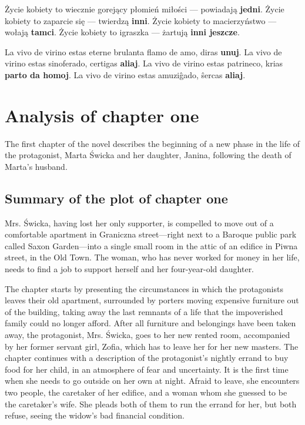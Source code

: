 \begin{displayquote}
  Życie kobiety to wiecznie gorejący płomień miłości --- powiadają \textbf{jedni}.
  Życie kobiety to zaparcie się --- twierdzą \textbf{inni}.
  Życie kobiety to macierzyństwo --- wołają \textbf{tamci}.
  Życie kobiety to igraszka --- żartują \textbf{inni jeszcze}.
\end{displayquote}

\begin{displayquote}
  La vivo de virino estas eterne brulanta flamo de amo, diras \textbf{unuj}. La vivo de virino estas sinoferado, certigas \textbf{aliaj}. La vivo de virino estas patrineco, krias \textbf{parto da homoj}. La vivo de virino estas amuziĝado, ŝercas \textbf{aliaj}.
\end{displayquote}

\section{Analysis of chapter one}

The first chapter of the novel describes the beginning of a new phase in the life of the protagonist, Marta Świcka and her daughter, Janina, following the death of Marta's husband.

\subsection{Summary of the plot of chapter one}
Mrs. Świcka, having lost her only supporter, is compelled to move out of a comfortable apartment in Graniczna street---right next to a Baroque public park called Saxon Garden---into a single small room in the attic of an edifice in Piwna street, in the Old Town.
The woman, who has never worked for money in her life, needs to find a job to support herself and her four-year-old daughter.

The chapter starts by presenting the circumstances in which the protagonists leaves their old apartment, surrounded by porters moving expensive furniture out of the building, taking away the last remnants of a life that the impoverished family could no longer afford.
After all furniture and belongings have been taken away, the protagonist, Mrs. Świcka, goes to her new rented room, accompanied by her former servant girl, Zofia, which has to leave her for her new masters.
The chapter continues with a description of the protagonist's nightly errand to buy food for her child, in an atmosphere of fear and uncertainty.
It is the first time when she needs to go outside on her own at night.
Afraid to leave, she encounters two people, the caretaker of her edifice, and a woman whom she guessed to be the caretaker's wife.
She pleads both of them to run the errand for her, but both refuse, seeing the widow's bad financial condition.


